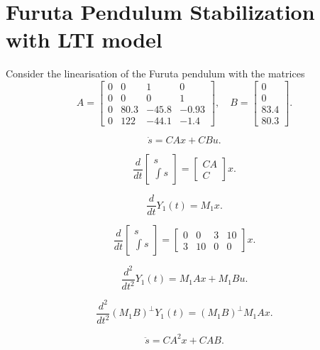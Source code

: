 \documentclass[10pt,letterpaper,twocolumn]{scrartcl}
\begin{document}
\section{Furuta Pendulum Stabilization with LTI model}

Consider the linearisation of the Furuta pendulum with the matrices
\[
    A = \begin{bmatrix} 0 & 0 & 1 & 0 \\ 0 & 0 & 0 & 1 \\ 0 & 80.3 & -45.8 & -0.93 \\ 0 & 122 & -44.1 & -1.4 \end{bmatrix}, \quad
    B = \begin{bmatrix} 0 \\ 0 \\ 83.4 \\ 80.3 \end{bmatrix}
.\]

\[
    \dot{s} = C A x + C B u 
.\]

\[
    \frac{d}{dt} \begin{bmatrix} s \\ \int s \end{bmatrix}  = \begin{bmatrix} CA \\ C \end{bmatrix}  x
.\]

\[
 \frac{d}{dt} Y_1(t) = M_1 x   
.\]

\[
    \frac{d}{dt} \begin{bmatrix} s \\ \int s \end{bmatrix}= \begin{bmatrix} 0 & 0 & 3 & 10 \\ 3 & 10 & 0 & 0 \end{bmatrix}  x   
.\]

\[
 \frac{d^2}{dt^2} Y_1(t) = M_1 A x + M_1 B u
.\]

\[
    \frac{d^2}{dt^2} (M_1 B)^\perp Y_1(t) = (M_1 B)^\perp M_1 A x 
.\]

\[
    \ddot{s} = C A^2 x + C A B
.\]
\end{document}
